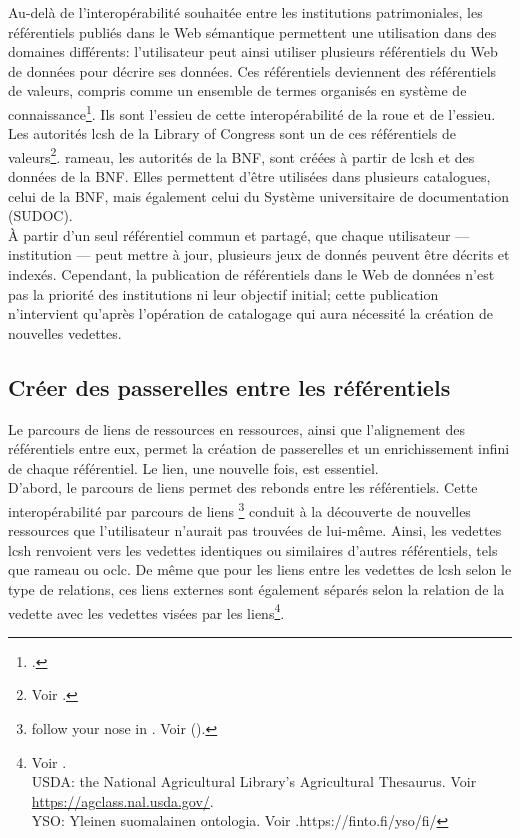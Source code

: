 Au-delà de l'interopérabilité souhaitée entre les institutions patrimoniales, les référentiels publiés dans le Web sémantique permettent une utilisation dans des domaines différents: l'utilisateur peut ainsi utiliser plusieurs référentiels du Web de données pour décrire ses données. Ces référentiels deviennent des référentiels de valeurs, compris comme un \og ensemble de termes organisés en système de connaissance\fg{}\footcite[p.47]{dalbin_approches_2011}. Ils sont l'essieu de cette interopérabilité de la roue et de l'essieu. Les autorités \ac{lcsh} de la Library of Congress sont un de ces référentiels de valeurs\footnote{Voir .}. \ac{rameau}, les autorités de la BNF, sont créées à partir de \ac{lcsh} et des données de la BNF. Elles permettent d'être utilisées dans plusieurs catalogues, celui de la BNF, mais également celui du Système universitaire de documentation (SUDOC).\\

À partir d'un seul référentiel commun et partagé, que chaque utilisateur --- institution --- peut mettre à jour, plusieurs jeux de donnés peuvent être décrits et indexés. Cependant, la publication de référentiels dans le Web de données n'est pas la priorité des institutions ni leur objectif initial; cette publication n'intervient qu'après l'opération de catalogage qui aura nécessité la création de nouvelles vedettes.

\subsection{\label{II-A-2-c}Créer des passerelles entre les référentiels}

Le parcours de liens de ressources en ressources, ainsi que l'alignement des référentiels entre eux, permet la création de passerelles et un enrichissement infini de chaque référentiel. Le lien, une nouvelle fois, est essentiel.\\

D'abord, le parcours de liens permet des rebonds entre les référentiels. Cette interopérabilité par parcours de liens \footnote{\og follow your nose\fg{} in \cite{bermes_convergence_2013}. Voir  ().} conduit à la découverte de nouvelles ressources que l'utilisateur n'aurait pas trouvées de lui-même. Ainsi, les vedettes \ac{lcsh} renvoient vers les vedettes identiques ou similaires d'autres référentiels, tels que \ac{rameau} ou \ac{oclc}. De même que pour les liens entre les vedettes de \ac{lcsh} selon le type de relations, ces liens externes sont également séparés selon la relation de la vedette avec les vedettes visées par les liens\footnote{Voir .\\USDA: the National Agricultural Library's Agricultural Thesaurus. Voir \url{https://agclass.nal.usda.gov/}.\\
YSO: Yleinen suomalainen ontologia. Voir \url{}.https://finto.fi/yso/fi/}.


